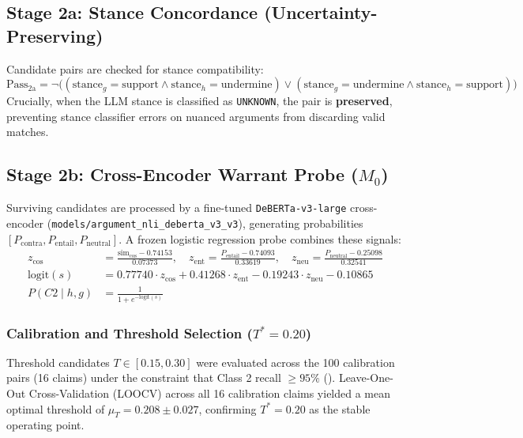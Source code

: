\documentclass[11pt,a4paper]{article}
\begin{document}
\subsection{Stage 2a: Stance Concordance (Uncertainty-Preserving)}
Candidate pairs are checked for stance compatibility:
\begin{equation}
\text{Pass}_{\text{2a}} = \neg \Big( (\text{stance}_g = \text{support} \land \text{stance}_h = \text{undermine}) \lor (\text{stance}_g = \text{undermine} \land \text{stance}_h = \text{support}) \Big)
\end{equation}
Crucially, when the LLM stance is classified as \texttt{UNKNOWN}, the pair is \textbf{preserved}, preventing stance classifier errors on nuanced arguments from discarding valid matches.

\subsection{Stage 2b: Cross-Encoder Warrant Probe ($M_0$)}
\label{subsec:stage2b}
Surviving candidates are processed by a fine-tuned \texttt{DeBERTa-v3-large} cross-encoder (\texttt{models/argument\_nli\_deberta\_v3\_v3}), generating probabilities $[P_{\text{contra}}, P_{\text{entail}}, P_{\text{neutral}}]$. A frozen logistic regression probe combines these signals:
\begin{align}
z_{\text{cos}} &= \frac{\text{sim}_{\text{cos}} - 0.74153}{0.07373}, \quad z_{\text{ent}} = \frac{P_{\text{entail}} - 0.74093}{0.33619}, \quad z_{\text{neu}} = \frac{P_{\text{neutral}} - 0.25098}{0.32541} \\
\text{logit}(s) &= 0.77740 \cdot z_{\text{cos}} + 0.41268 \cdot z_{\text{ent}} - 0.19243 \cdot z_{\text{neu}} - 0.10865 \\
P(C2 \mid h, g) &= \frac{1}{1 + e^{-\text{logit}(s)}}
\end{align}

\subsubsection{Calibration and Threshold Selection ($T^* = 0.20$)}
Threshold candidates $T \in [0.15, 0.30]$ were evaluated across the 100 calibration pairs (16 claims) under the constraint that Class 2 recall $\ge 95\%$ (). Leave-One-Out Cross-Validation (LOOCV) across all 16 calibration claims yielded a mean optimal threshold of $\mu_T = 0.208 \pm 0.027$, confirming \textbf{$T^* = 0.20$} as the stable operating point.
\end{document}
